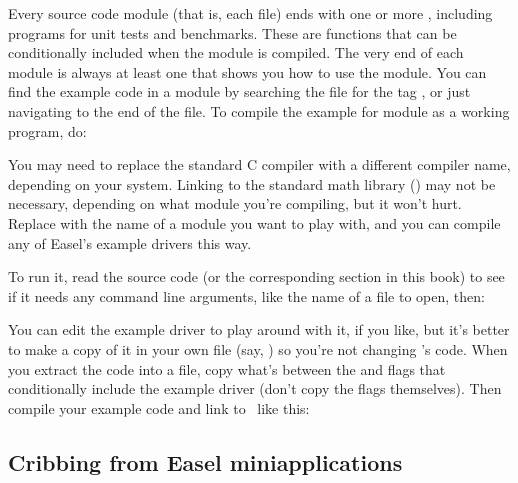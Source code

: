 Every source code module (that is, each  file) ends with one
or more , including programs for unit tests
and benchmarks. These are  functions that can be
conditionally included when the module is compiled. The very end of
each module is always at least one  that shows
you how to use the module. You can find the example code in a module
 by searching the  file for the tag
, or just navigating to the end of the file. To
compile the example for module  as a working program, do:

\begin{cchunk}
\end{cchunk}

You may need to replace the standard C compiler  with a
different compiler name, depending on your system. Linking to the
standard math library () may not be necessary, depending on
what module you're compiling, but it won't hurt. Replace 
with the name of a module you want to play with, and you can compile
any of Easel's example drivers this way.

To run it, read the source code (or the corresponding section in this
book) to see if it needs any command line arguments, like the name of
a file to open, then:

\begin{cchunk}
\end{cchunk}

You can edit the example driver to play around with it, if you like,
but it's better to make a copy of it in your own file (say,
) so you're not changing \Easel's code. When you
extract the code into a file, copy what's between the  and  flags that
conditionally include the example driver (don't copy the flags
themselves). Then compile your example code and link to \Easel\ like
this:

\begin{cchunk}
\end{cchunk}

\subsection{Cribbing from Easel miniapplications}

